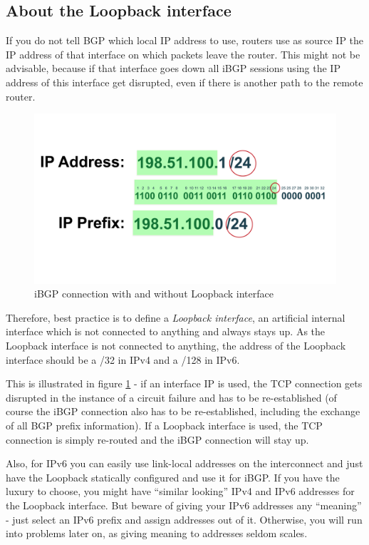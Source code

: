 \subsection{About the Loopback interface}
If you do not tell BGP which local IP address to use, routers use as source IP the IP address of that interface on which packets leave the router. This might not be advisable, because if that interface goes down all iBGP sessions using the IP address of this interface get disrupted, even if there is another path to the remote router.

\begin{figure}
  \centering
  \includegraphics[width=\linewidth,page=11]{img/Drawings.pdf}
  \caption{iBGP connection with and without Loopback interface}
  \label{fig:ibgploopback}
\end{figure}

Therefore, best practice is to define a \emph{Loopback interface}, an artificial internal interface which is not connected to anything and always stays up. As the Loopback interface is not connected to anything, the address of the Loopback interface should be a /32 in IPv4 and a /128 in IPv6.

This is illustrated in figure \ref{fig:ibgploopback} - if an interface IP is used, the TCP connection gets disrupted in the instance of a circuit failure and has to be re-established (of course the iBGP connection also has to be re-established, including the exchange of all BGP prefix information). If a Loopback interface is used, the TCP connection is simply re-routed and the iBGP connection will stay up.

Also, for IPv6 you can easily use link-local addresses on the interconnect and just have the Loopback statically configured and use it for iBGP. If you have the luxury to choose, you might have ``similar looking'' IPv4 and IPv6 addresses for the Loopback interface. But beware of giving your IPv6 addresses any ``meaning'' - just select an IPv6 prefix and assign addresses out of it. Otherwise, you will run into problems later on, as giving meaning to addresses seldom scales.

